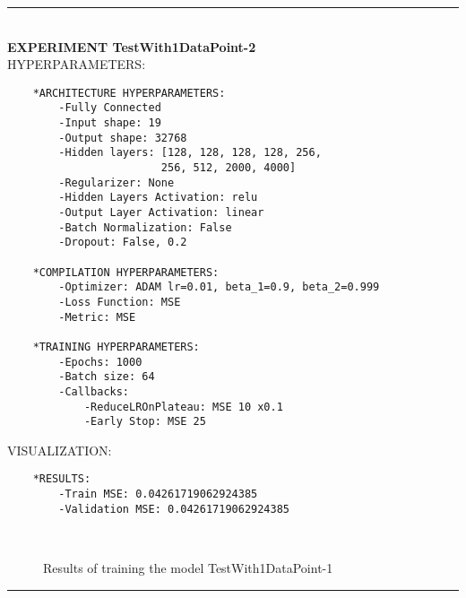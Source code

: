 \rule{0.5\textwidth}{0.5pt}\\

	{\large \textbf{EXPERIMENT TestWith1DataPoint-2}}\\
	
	{\normalsize HYPERPARAMETERS:}
	\begin{lstlisting}
	*ARCHITECTURE HYPERPARAMETERS:
		-Fully Connected
		-Input shape: 19
		-Output shape: 32768
		-Hidden layers: [128, 128, 128, 128, 256,
						256, 512, 2000, 4000]
		-Regularizer: None
		-Hidden Layers Activation: relu
		-Output Layer Activation: linear
		-Batch Normalization: False
		-Dropout: False, 0.2
	
	*COMPILATION HYPERPARAMETERS:
		-Optimizer: ADAM lr=0.01, beta_1=0.9, beta_2=0.999
		-Loss Function: MSE
		-Metric: MSE
	
	*TRAINING HYPERPARAMETERS:
		-Epochs: 1000
		-Batch size: 64
		-Callbacks: 
			-ReduceLROnPlateau: MSE 10 x0.1
			-Early Stop: MSE 25
	\end{lstlisting}
	
	{\normalsize VISUALIZATION:}
	\begin{lstlisting}
	*RESULTS:
        -Train MSE: 0.04261719062924385
        -Validation MSE: 0.04261719062924385
	\end{lstlisting}
	
	\begin{figure*}[ht!]
		\hspace{\fill}
		\hspace{\fill}	
		\\
		\caption{Results of training the model TestWith1DataPoint-1}
	\end{figure*}
	
\FloatBarrier	
\rule{0.5\textwidth}{0.5pt}\\